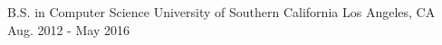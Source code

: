 

\begin{cventries}

  \cventry
    {B.S. in Computer Science} %
    {University of Southern California} %
    {Los Angeles, CA} %
    {Aug. 2012 - May 2016} %

\end{cventries}
